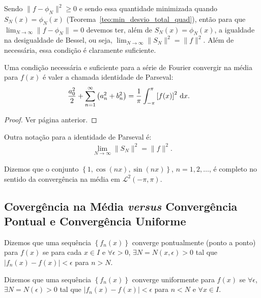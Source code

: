 Sendo $\| f - \phi_N \|^2 \geq 0$ e sendo essa quantidade minimizada quando $S_N(x) = \phi_N(x)$ (Teorema~\ref{teo:min_desvio_total_quad}), ent\~{a}o para que $\lim_{N \to \infty} \| f - \phi_N \| = 0$ devemos ter, al\'{e}m de $S_N(x) = \phi_N(x)$, a igualdade na desigualdade de Bessel, ou seja, $\lim_{N \to \infty} \| S_N \|^2 = \| f \|^2$. Al\'{e}m de necess\'{a}ria, essa condi\c{c}\~{a}o \'{e} claramente suficiente.

\begin{teo}
    Uma condi\c{c}\~{a}o necess\'{a}ria e suficiente para a s\'{e}rie de Fourier convergir na m\'{e}dia para $f(x)$ \'{e} valer a chamada identidade de Parseval:
    \begin{align*}
        \frac{a_0^2}{2} + \sum_{n = 1}^\infty \left( a_n^2 + b_n^2 \right) &= \frac{1}{\pi} \int_{-\pi}^\pi \left[ f(x) \right]^2 \, \mathrm{d}x.
    \end{align*}
\end{teo}
\begin{proof}
    Ver p\'{a}gina anterior.
\end{proof}

Outra nota\c{c}\~{a}o para a identidade de Parseval \'{e}:
\begin{align*}
    \lim_{N \to \infty} \| S_N \|^2 = \| f \|^2.
\end{align*}

\begin{obs}
    Dizemos que o conjunto $\left\{ 1, \cos\left( n x \right), \sin\left( n x \right) \right\}$, $n = 1, 2, \ldots$, \'{e} completo no sentido da converg\^{e}ncia na m\'{e}dia em $\mathcal{L}^2(-\pi, \pi)$.
\end{obs}

\subsection{Coverg\^{e}ncia na M\'{e}dia \textit{versus} Converg\^{e}ncia Pontual e Converg\^{e}ncia Uniforme}
Dizemos que uma sequ\^{e}ncia $\left\{ f_n(x) \right\}$ converge pontualmente (ponto a ponto) para $f(x)$ se para cada $x \in I$ e $\forall \epsilon > 0$, $\exists N = N(x, \epsilon) > 0$ tal que $| f_n(x) - f(x) | < \epsilon$ para $n > N$.

Dizemos que uma sequ\^{e}ncia $\left\{ f_n(x) \right\}$ converge uniformente para $f(x)$ se $\forall \epsilon$, $\exists N = N(\epsilon) > 0$ tal que $| f_n(x) - f(x) | < \epsilon$ para $n < N$ e $\forall x \in I$.


